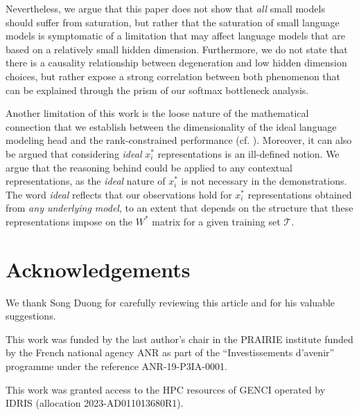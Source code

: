 Nevertheless, we argue that this paper does not show that \textit{all} small models should suffer from saturation, but rather that the saturation of small language models is symptomatic of a limitation that may affect language models that are based on a relatively small hidden dimension. Furthermore, we do not state that there is a causality relationship between degeneration and low hidden dimension choices, but rather expose a strong correlation between both phenomenon that can be explained through the prism of our softmax bottleneck analysis.


Another limitation of this work is the loose nature of the mathematical connection that we establish between the dimensionality of the ideal language modeling head and the rank-constrained performance (cf. ). Moreover, it can also be argued that considering \textit{ideal} $x_i^*$ representations is an ill-defined notion. We argue that the reasoning behind  could be applied to any contextual representations, as the \textit{ideal} nature of $x_i^*$ is not necessary in the demonstrations. The word \textit{ideal} reflects that our observations hold for $x_i^*$ representations obtained from \textit{any underlying model}, to an extent that depends on the structure that these representations impose on the $W^*$ matrix for a given training set $\mathcal{T}$.

\section*{Acknowledgements}
We thank Song Duong for carefully reviewing this article and for his valuable suggestions.

This work was funded by the last author's chair in the PRAIRIE institute funded by the French national agency ANR as part of the ``Investissements d'avenir'' programme under the reference ANR-19-P3IA-0001. 

This work was granted access to the HPC resources of GENCI operated by IDRIS (allocation 2023-AD011013680R1).



